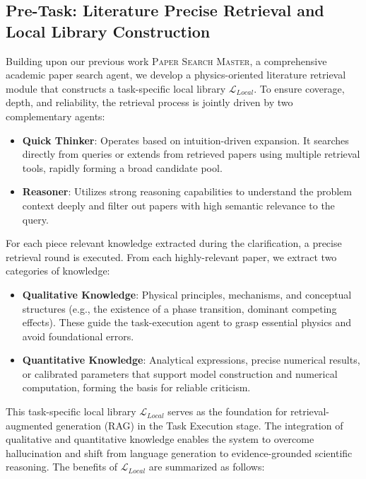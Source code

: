 \documentclass[11pt, a4paper, logo, copyright, nonumbering]{SAI}
\begin{document}
\subsection{Pre-Task: Literature Precise Retrieval and Local Library Construction}

Building upon our previous work \textsc{Paper Search Master}, a comprehensive academic paper search agent, we develop a physics-oriented literature retrieval module that constructs a task-specific local library $\mathcal{L}_{Local}$. To ensure coverage, depth, and reliability, the retrieval process is jointly driven by two complementary agents:

\begin{itemize}
    \item \textbf{Quick Thinker}: Operates based on intuition-driven expansion. It searches directly from queries or extends from retrieved papers using multiple retrieval tools, rapidly forming a broad candidate pool.
    \item \textbf{Reasoner}: Utilizes strong reasoning capabilities to understand the problem context deeply and filter out papers with high semantic relevance to the query.
\end{itemize}

For each piece relevant knowledge extracted during the clarification, a precise retrieval round is executed. From each highly-relevant paper, we extract two categories of knowledge:

\begin{itemize}
    \item \textbf{Qualitative Knowledge}: Physical principles, mechanisms, and conceptual structures (e.g., the existence of a phase transition, dominant competing effects). These guide the task-execution agent to grasp essential physics and avoid foundational errors.
    \item \textbf{Quantitative Knowledge}: Analytical expressions, precise numerical results, or calibrated parameters that support model construction and numerical computation, forming the basis for reliable criticism.
\end{itemize}

This task-specific local library $\mathcal{L}_{Local}$ serves as the foundation for retrieval-augmented generation (RAG) in the Task Execution stage. The integration of qualitative and quantitative knowledge enables the system to overcome hallucination and shift from language generation to evidence-grounded scientific reasoning. The benefits of $\mathcal{L}_{Local}$ are summarized as follows:
\end{document}
